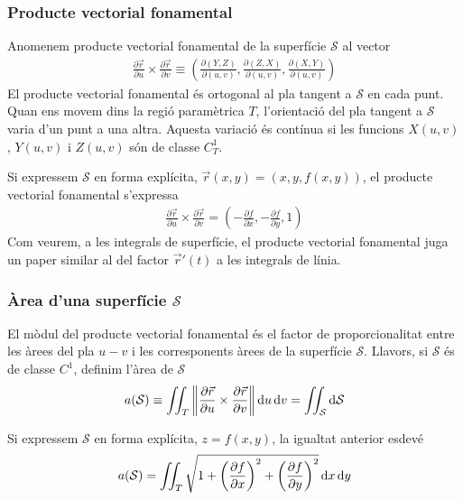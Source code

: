 \subsubsection*{Producte vectorial fonamental}
\begin{defi}
	Anomenem producte vectorial fonamental de la superfície $\mathcal{S}$ al vector
	\begin{align}
		\frac{\partial \vec{r}}{\partial u} \times \frac{\partial \vec{r}}{\partial v} \equiv \left( \frac{\partial (Y, Z)}{\partial (u,v)}, \frac{\partial (Z, X)}{\partial (u,v)}, \frac{\partial (X, Y)}{\partial (u,v)} \right)
	\end{align}
	El producte vectorial fonamental és ortogonal al pla tangent a $\mathcal{S}$ en cada punt. Quan ens movem dins la regió paramètrica $T$, l'orientació del pla tangent a $\mathcal{S}$ varia d'un punt a una altra. Aquesta variació és contínua si les funcions $X(u,v)$, $Y(u,v)$ i $Z(u,v)$ són de classe $C^{1}_{T}$.
\end{defi}
Si expressem $\mathcal{S}$ en forma explícita, $\vec{r}(x,y) = (x,y,f(x,y))$, el producte vectorial fonamental s'expressa
\begin{align*}
	\frac{\partial \vec{r}}{\partial u} \times \frac{\partial \vec{r}}{\partial v} = \left( -\frac{\partial f}{\partial x}, -\frac{\partial f}{\partial y}, 1 \right)
\end{align*}
Com veurem, a les integrals de superfície, el producte vectorial fonamental juga un paper similar al del factor $\vec{r}'(t)$ a les integrals de línia.

\subsubsection*{Àrea d'una superfície $\mathcal{S}$}
\begin{defi}
	El mòdul del producte vectorial fonamental és el factor de proporcionalitat entre les àrees del pla $u-v$ i les corresponents àrees de la superfície $\mathcal{S}$. Llavors, si $\mathcal{S}$ és de classe $C^{1}$, definim l'àrea de $\mathcal{S}$
	\begin{align}
		a(\mathcal{S}) \equiv \iint_{T} \left\| \frac{\partial \vec{r}}{\partial u} \times \frac{\partial \vec{r}}{\partial v} \right\| \mathop{}\!\mathrm{d} u \mathop{}\!\mathrm{d} v = \iint_{\mathcal{S}} \mathrm{d} \mathcal{S}
	\end{align}
\end{defi}
Si expressem $\mathcal{S}$ en forma explícita, $z=f(x,y)$, la igualtat anterior esdevé
\begin{align*}
	a(\mathcal{S}) = \iint_{T} \sqrt{1 + \left( \frac{\partial f}{\partial x} \right)^{2} + \left( \frac{\partial f}{\partial y} \right)^{2} } \mathop{}\!\mathrm{d} x \mathop{}\!\mathrm{d} y
\end{align*}

